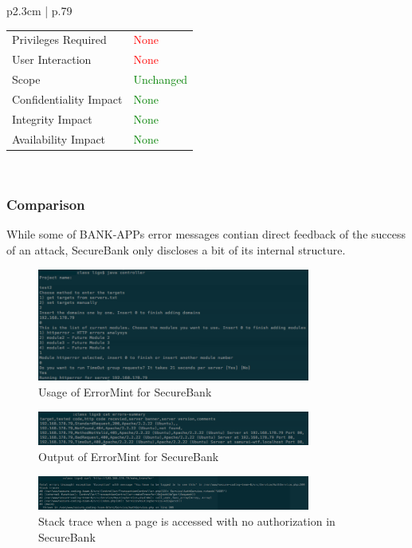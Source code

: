 \begin{longtable}{ p{2.3cm} | p{.79\linewidth} }
\begin{tabular}[t]{@{}l | l}
            Privileges Required     & \textcolor{red}{None} \\
            User Interaction        & \textcolor{red}{None} \\
            Scope                   & \textcolor{Green}{Unchanged} \\
            Confidentiality Impact  & \textcolor{Green}{None} \\
            Integrity Impact        & \textcolor{Green}{None} \\
            Availability Impact     & \textcolor{Green}{None}
        \end{tabular}
    \\ \hline
\end{longtable}

\subsubsection{Comparison}
While some of BANK-APPs error messages contian direct feedback of the success of an attack, SecureBank only discloses a bit of its internal structure.
\begin{figure}[p]
    \centering
    \includegraphics[width=0.8\textwidth]{figures/OTG-ERR-001-1.png}
    \caption{Usage of ErrorMint for SecureBank}
    \label{fig:OTG_ERR_001_1}
\end{figure}
\begin{figure}[p]
    \centering
    \includegraphics[width=0.8\textwidth]{figures/OTG-ERR-001-2.png}
    \caption{Output of ErrorMint for SecureBank}
    \label{fig:OTG_ERR_001_2}
\end{figure}
\begin{figure}[p]
    \centering
    \includegraphics[width=0.8\textwidth]{figures/OTG-ERR-001-3.png}
    \caption{Stack trace when a page is accessed with no authorization in SecureBank}
    \label{fig:OTG_ERR_001_3}
\end{figure}
\clearpage